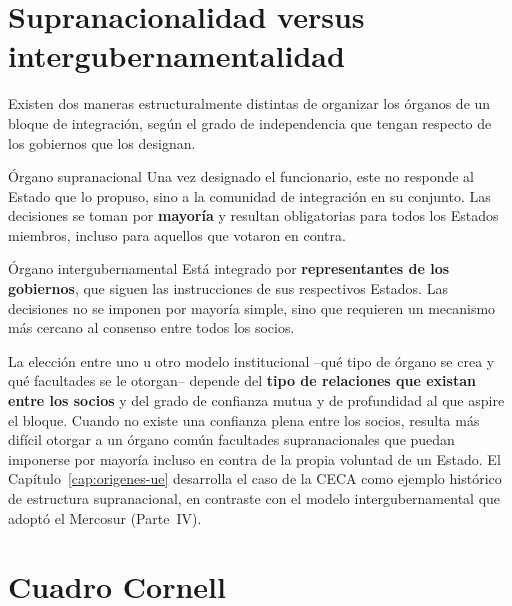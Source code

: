 \documentclass[12pt,oneside]{book}
\begin{document}
\section{Supranacionalidad versus intergubernamentalidad}
\label{sec:supra}

Existen dos maneras estructuralmente distintas de organizar los órganos de un bloque de integración, según el grado de independencia que tengan respecto de los gobiernos que los designan.

\begin{definicion}{Órgano supranacional}
Una vez designado el funcionario, este no responde al Estado que lo propuso, sino a la comunidad de integración en su conjunto. Las decisiones se toman por \textbf{mayoría} y resultan obligatorias para todos los Estados miembros, incluso para aquellos que votaron en contra.
\end{definicion}

\begin{definicion}{Órgano intergubernamental}
Está integrado por \textbf{representantes de los gobiernos}, que siguen las instrucciones de sus respectivos Estados. Las decisiones no se imponen por mayoría simple, sino que requieren un mecanismo más cercano al consenso entre todos los socios.
\end{definicion}

La elección entre uno u otro modelo institucional --qué tipo de órgano se crea y qué facultades se le otorgan-- depende del \textbf{tipo de relaciones que existan entre los socios} y del grado de confianza mutua y de profundidad al que aspire el bloque. Cuando no existe una confianza plena entre los socios, resulta más difícil otorgar a un órgano común facultades supranacionales que puedan imponerse por mayoría incluso en contra de la propia voluntad de un Estado. El Capítulo~\ref{cap:origenes-ue} desarrolla el caso de la CECA como ejemplo histórico de estructura supranacional, en contraste con el modelo intergubernamental que adoptó el Mercosur (Parte~IV).

\section{Cuadro Cornell}
\end{document}
